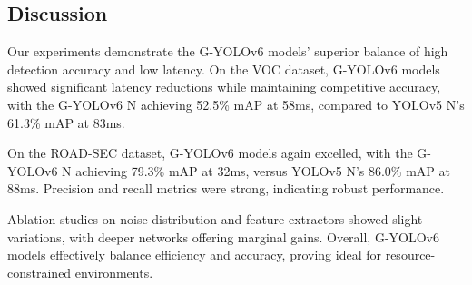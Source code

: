 \subsection{Discussion}

Our experiments demonstrate the G-YOLOv6 models' superior balance of high detection accuracy and low latency. On the VOC dataset, G-YOLOv6 models showed significant latency reductions while maintaining competitive accuracy, with the G-YOLOv6 N achieving 52.5\% mAP at 58ms, compared to YOLOv5 N's 61.3\% mAP at 83ms.

On the ROAD-SEC dataset, G-YOLOv6 models again excelled, with the G-YOLOv6 N achieving 79.3\% mAP at 32ms, versus YOLOv5 N's 86.0\% mAP at 88ms. Precision and recall metrics were strong, indicating robust performance.

Ablation studies on noise distribution and feature extractors showed slight variations, with deeper networks offering marginal gains. Overall, G-YOLOv6 models effectively balance efficiency and accuracy, proving ideal for resource-constrained environments.

\clearpage

